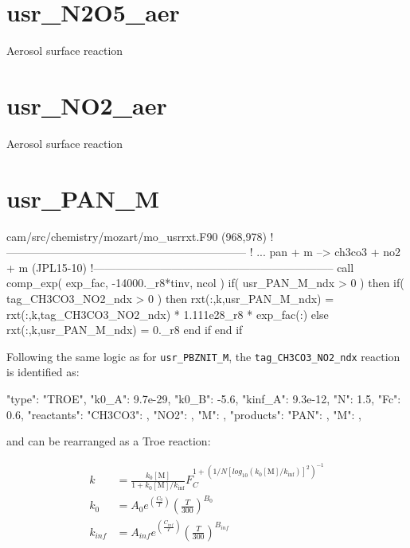 \documentclass[titlepage]{article}
\begin{document}
\section{usr\_N2O5\_aer}

Aerosol surface reaction


\section{usr\_NO2\_aer}

Aerosol surface reaction


\section{usr\_PAN\_M}

\begin{blockcode}[commandchars=\\\{\}]
\color{gray}cam/src/chemistry/mozart/mo_usrrxt.F90 (968,978)
!-----------------------------------------------------------------
! ... pan + m --> ch3co3 + no2 + m (JPL15-10)
!-----------------------------------------------------------------
       call comp_exp( exp_fac, -14000._r8*tinv, ncol )
       if( usr_PAN_M_ndx > 0 ) then
          if( tag_CH3CO3_NO2_ndx > 0 ) then
             rxt(:,k,usr_PAN_M_ndx) = rxt(:,k,tag_CH3CO3_NO2_ndx) * 1.111e28_r8 * exp_fac(:)
          else
             rxt(:,k,usr_PAN_M_ndx) = 0._r8
          end if
       end if
\end{blockcode}

Following the same logic as for \verb>usr_PBZNIT_M>, the \verb>tag_CH3CO3_NO2_ndx> reaction is identified as:

\begin{blockcode}
         {
          "type": "TROE",
          "k0_A": 9.7e-29,
          "k0_B": -5.6,
          "kinf_A": 9.3e-12,
          "N": 1.5,
          "Fc": 0.6,
          "reactants": {
            "CH3CO3": { },
            "NO2": { },
            "M": { }
          },
          "products": {
            "PAN": { },
            "M": { }
          }
        },
\end{blockcode}

\noindent and can be rearranged as a Troe reaction:

\begin{equation}
\begin{split}
k & = \frac{k_0[\mbox{M}]}{1+k_0[\mbox{M}]/k_{\inf}}F_C^{1+(1/N[log_{10}(k_0[\mbox{M}]/k_{\inf})]^2)^{-1}} \\
k_0 & = A_0 e^{\left( \frac{C_0}{T} \right)} \left( \frac{T}{300} \right)^{B_0} \\
k_{inf} & = A_{inf} e^{\left( \frac{C_{inf}}{T} \right)} \left( \frac{T}{300} \right)^{B_{inf}}
\end{split}
\end{equation}
\end{document}
